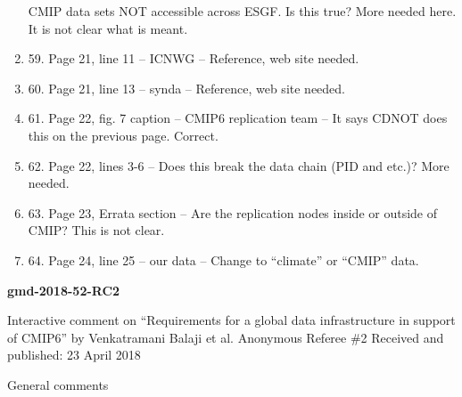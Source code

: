 \documentclass[gmd,manuscript]{copernicus}
\begin{document}
\begin{enumerate}[label=RC1-\arabic*,leftmargin=*]
  CMIP data sets NOT accessible across ESGF. Is this true? More needed
  here. It is not clear what is meant.
\item 59. Page 21, line 11 – ICNWG – Reference, web site needed.
\item 60. Page 21, line 13 – synda – Reference, web site needed.
\item 61. Page 22, fig. 7 caption – CMIP6 replication team – It says
  CDNOT does this on the previous page. Correct.
\item 62. Page 22, lines 3-6 – Does this break the data chain (PID and
  etc.)? More needed.
\item 63. Page 23, Errata section – Are the replication nodes inside
  or outside of CMIP? This is not clear.
\item 64. Page 24, line 25 – our data – Change to “climate” or “CMIP”
  data.
\end{enumerate}

\pagebreak


\textbf{gmd-2018-52-RC2}

Interactive comment on “Requirements for a
global data infrastructure in support of CMIP6” by
Venkatramani Balaji et al.
Anonymous Referee \#2
Received and published: 23 April 2018

General comments
\end{document}
